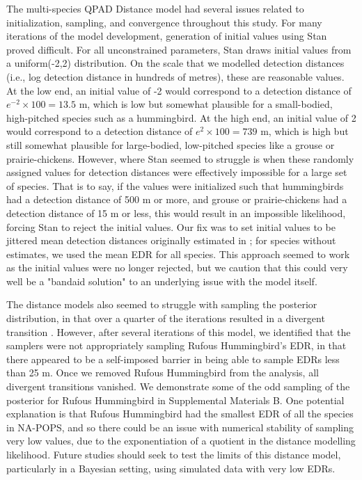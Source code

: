 \documentclass[12pt]{article}
\begin{document}
\par The multi-species QPAD Distance model had several issues related to initialization, sampling, and convergence throughout this study.
For many iterations of the model development, generation of initial values using Stan proved difficult.
For all unconstrained parameters, Stan draws initial values from a uniform(-2,2) distribution.
On the scale that we modelled detection distances (i.e., log detection distance in hundreds of metres), these are reasonable values.
At the low end, an initial value of -2 would correspond to a detection distance of $e^{-2} \times 100 = 13.5$ m, which is low but somewhat plausible for a small-bodied, high-pitched species such as a hummingbird.
At the high end, an initial value of 2 would correspond to a detection distance of $e^{2} \times 100 = 739$ m, which is high but still somewhat plausible for large-bodied, low-pitched species like a grouse or prairie-chickens.
However, where Stan seemed to struggle is when these randomly assigned values for detection distances were effectively impossible for a large set of species.
That is to say, if the values were initialized such that hummingbirds had a detection distance of 500 m or more, and grouse or prairie-chickens had a detection distance of 15 m or less, this would result in an impossible likelihood, forcing Stan to reject the initial values.
Our fix was to set initial values to be jittered mean detection distances originally estimated in \citet{edwards_point_2023}; for species without estimates, we used the mean EDR for all species.
This approach seemed to work as the initial values were no longer rejected, but we caution that this could very well be a "bandaid solution" to an underlying issue with the model itself.

\par The distance models also seemed to struggle with sampling the posterior distribution, in that over a quarter of the iterations resulted in a divergent transition \citep{betancourt_diagnosing_2016, leimkuhler_simulating_2005}.
However, after several iterations of this model, we identified that the samplers were not appropriately sampling Rufous Hummingbird's EDR, in that there appeared to be a self-imposed barrier in being able to sample EDRs less than 25 m. 
Once we removed Rufous Hummingbird from the analysis, all divergent transitions vanished.
We demonstrate some of the odd sampling of the posterior for Rufous Hummingbird in Supplemental Materials B.
One potential explanation is that Rufous Hummingbird had the smallest EDR of all the species in NA-POPS, and so there could be an issue with numerical stability of sampling very low values, due to the exponentiation of a quotient in the distance modelling likelihood.
Future studies should seek to test the limits of this distance model, particularly in a Bayesian setting, using simulated data with very low EDRs.
\end{document}
